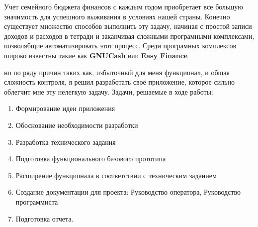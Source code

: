 
Учет семейного бюджета финансов с каждым годом приобретает все большую значимость для успешного выживания в условиях нашей страны. Конечно существует множество способов выполнить эту задачу, начиная с простой
записи доходов и расходов в тетради и заканчивая сложными програмными
комплексами, позволябщие автоматизировать этот процесс. Среди програмных комплексов широко известны такие как \textbf{GNUCash} или \textbf{Easy Finance}

но по ряду причин таких как, избыточный для меня функционал, и общая сложность контроля, я решил разработать своё приложение, которое сильно облегчит мне эту нелегкую задачу.
Задачи, решаемые в ходе работы:
\begin{enumerate}
\item Формирование идеи приложения
\item Обоснование необходимости разработки
\item Разработка технического задания
\item Подготовка функционального базового прототипа
\item Расширение функционала в соответствии с техническим заданием
\item Создание документации для проекта: Руководство оператора, Руководство программиста
\item Подготовка отчета. 
\end{enumerate}
